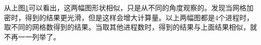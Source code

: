 \documentclass[a4paper,11pt]{ctexart} %
\begin{document}
\begin{figure}[ht]
\label{fig:3}
\centering 
{}
\end{figure}
从上图\ref{fig:3}可以看出，这两幅图形状相似，只是从不同的角度观察的。发现当网格加密时，得到的结果更光滑，但是这样会增大计算量。以上两幅图都是4个进程时，取不同的网格数得到的结果。当取其他进程数时，得到的结果与上面结果相似，就不再一一列举了。
\end{document}
